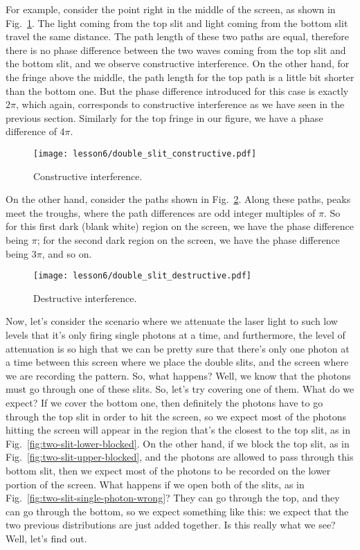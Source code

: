 For example, consider the point right in the middle of the screen, as shown in Fig.~\ref{fig:two-slit-constructive}. The light coming from the top slit and light coming from the bottom slit travel the same distance. The path length of these two paths are equal, therefore there is no phase difference between the two waves coming from the top slit and the bottom slit, and we observe constructive interference. On the other hand, for the fringe above the middle, the path length for the top path is a little bit shorter than the bottom one. But the phase difference introduced for this case is exactly $2\pi$, which again, corresponds to constructive interference as we have seen in the previous section. Similarly for the top fringe in our figure, we have a phase difference of $4\pi$.
\begin{figure}[H]
   \centering
    \texttt{[image: lesson6/double\_slit\_constructive.pdf]}    
        \caption{Constructive interference.}
    \label{fig:two-slit-constructive}    
\end{figure}

On the other hand, consider the paths shown in Fig.~\ref{fig:two-slit-destructive}. Along these paths, peaks meet the troughs, where the path differences are odd integer multiples of $\pi$. So for this first dark (blank white) region on the screen, we have the phase difference being $\pi$; for the second dark region on the screen, we have the phase difference being $3\pi$, and so on.

\begin{figure}[H]
   \centering
    \texttt{[image: lesson6/double\_slit\_destructive.pdf]}
        \caption{Destructive interference.}
    \label{fig:two-slit-destructive}    
\end{figure}

Now, let's consider the scenario where we attenuate the laser light to such low levels that it's only firing single photons at a time, and furthermore, the level of attenuation is so high that we can be pretty sure that there's only one photon at a time between this screen where we place the double slits, and the screen where we are recording the pattern. So, what happens? Well, we know that the photons must go through one of these slits. So, let's try covering one of them. What do we expect? If we cover the bottom one, then definitely the photons have to go through the top slit in order to hit the screen, so we expect most of the photons hitting the screen will appear in the region that's the closest to the top slit, as in Fig.~\ref{fig:two-slit-lower-blocked}. On the other hand, if we block the top slit, as in Fig.~\ref{fig:two-slit-upper-blocked}, and the photons are allowed to pass through this bottom slit, then we expect most of the photons to be recorded on the lower portion of the screen. What happens if we open both of the slits, as in Fig.~\ref{fig:two-slit-single-photon-wrong}? They can go through the top, and they can go through the bottom, so we expect something like this: we expect that the two previous distributions are just added together. Is this really what we see? Well, let's find out. 

